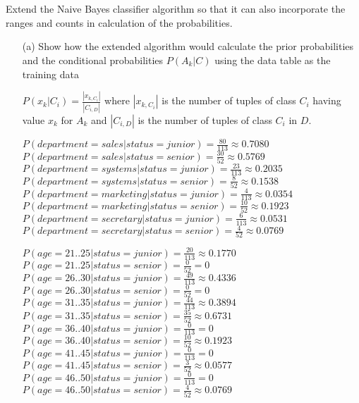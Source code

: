 \documentclass{scrartcl}
\begin{document}
\section{}
Extend the Naive Bayes classifier algorithm so that it can also incorporate the ranges and counts in calculation of the probabilities.

\begin{enumerate}
  \item[(a)] Show how the extended algorithm would calculate the prior probabilities and the conditional probabilities $P(A_k | C)$ using the data table as the training data
  
  $P(x_k | C_i) = \frac{|x_{k, C_i}|}{|C_{i, D}|}$ where $|x_{k, C_i}|$ is the number of tuples of class $C_i$ having value $x_k$ for $A_k$ and $|C_{i, D}|$ is the number of tuples of class $C_i$ in $D$.
  
  $P(department = sales | status = junior) = \frac{80}{113} \approx 0.7080$ \\
  $P(department = sales | status = senior) = \frac{30}{52} \approx 0.5769$ \\
  $P(department = systems | status = junior) = \frac{23}{113} \approx 0.2035$ \\
  $P(department = systems | status = senior) = \frac{8}{52} \approx 0.1538$ \\
  $P(department = marketing | status = junior) = \frac{4}{113} \approx 0.0354$ \\
  $P(department = marketing | status = senior) = \frac{10}{52} \approx 0.1923$ \\
  $P(department = secretary | status = junior) = \frac{6}{113} \approx 0.0531$ \\
  $P(department = secretary | status = senior) = \frac{4}{52} \approx 0.0769$
  
  $P(age = 21..25 | status = junior) = \frac{20}{113} \approx 0.1770$ \\
  $P(age = 21..25 | status = senior) = \frac{0}{52} = 0$ \\
  $P(age = 26..30 | status = junior) = \frac{49}{113} \approx 0.4336$ \\
  $P(age = 26..30 | status = senior) = \frac{0}{52} = 0$ \\
  $P(age = 31..35 | status = junior) = \frac{44}{113} \approx 0.3894$ \\
  $P(age = 31..35 | status = senior) = \frac{35}{52} \approx 0.6731$ \\
  $P(age = 36..40 | status = junior) = \frac{0}{113} = 0$ \\
  $P(age = 36..40 | status = senior) = \frac{10}{52} \approx 0.1923$ \\
  $P(age = 41..45 | status = junior) = \frac{0}{113} = 0$ \\
  $P(age = 41..45 | status = senior) = \frac{3}{52} \approx 0.0577$ \\
  $P(age = 46..50 | status = junior) = \frac{0}{113} = 0$ \\
  $P(age = 46..50 | status = senior) = \frac{4}{52} \approx 0.0769$
  

\end{enumerate}
\end{document}
